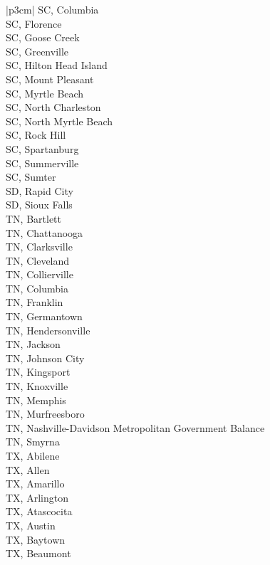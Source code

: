 \begin{customLongTable}{ |p{3cm}| }
SC, Columbia \\ \hline
SC, Florence \\ \hline
SC, Goose Creek \\ \hline
SC, Greenville \\ \hline
SC, Hilton Head Island \\ \hline
SC, Mount Pleasant \\ \hline
SC, Myrtle Beach \\ \hline
SC, North Charleston \\ \hline
SC, North Myrtle Beach \\ \hline
SC, Rock Hill \\ \hline
SC, Spartanburg \\ \hline
SC, Summerville \\ \hline
SC, Sumter \\ \hline
SD, Rapid City \\ \hline
SD, Sioux Falls \\ \hline
TN, Bartlett \\ \hline
TN, Chattanooga \\ \hline
TN, Clarksville \\ \hline
TN, Cleveland \\ \hline
TN, Collierville \\ \hline
TN, Columbia \\ \hline
TN, Franklin \\ \hline
TN, Germantown \\ \hline
TN, Hendersonville \\ \hline
TN, Jackson \\ \hline
TN, Johnson City \\ \hline
TN, Kingsport \\ \hline
TN, Knoxville \\ \hline
TN, Memphis \\ \hline
TN, Murfreesboro \\ \hline
TN, Nashville-Davidson Metropolitan Government Balance \\ \hline
TN, Smyrna \\ \hline
TX, Abilene \\ \hline
TX, Allen \\ \hline
TX, Amarillo \\ \hline
TX, Arlington \\ \hline
TX, Atascocita \\ \hline
TX, Austin \\ \hline
TX, Baytown \\ \hline
TX, Beaumont \\ \hline

\end{customLongTable}

